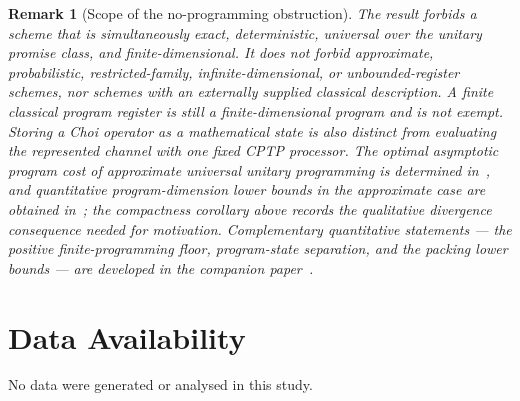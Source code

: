 \documentclass[11pt,a4paper]{article}
\newtheorem{remark}[theorem]{Remark}
\begin{document}
\begin{remark}[Scope of the no-programming obstruction]
\label{rem:scope}
The result forbids a scheme that is simultaneously exact, deterministic, universal over the unitary promise class, and finite-dimensional. It does not forbid approximate, probabilistic, restricted-family, infinite-dimensional, or unbounded-register schemes, nor schemes with an externally supplied classical description. A finite classical program register is still a finite-dimensional program and is not exempt. Storing a Choi operator as a mathematical state is also distinct from evaluating the represented channel with one fixed CPTP processor. The optimal asymptotic program cost of approximate universal unitary programming is determined in~\cite{YangRennerChiribella2020}, and quantitative program-dimension lower bounds in the approximate case are obtained in~\cite{KubickiPalazuelosPerezGarcia2019}; the compactness corollary above records the qualitative divergence consequence needed for motivation. Complementary quantitative statements --- the positive finite-programming floor, program-state separation, and the packing lower bounds --- are developed in the companion paper~\cite{CompanionChannels}.
\end{remark}

\section*{Data Availability}
No data were generated or analysed in this study.
\end{document}
